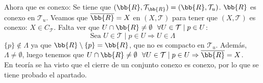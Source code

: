 \documentclass[12pt]{article}
\newcounter{ejercicio}[section] %
\newcounter{ejercicio}
\begin{document}
\begin{ejercicio}[3 puntos]
\begin{enumerate}[label=(\alph*)]
                \noindent
                Ahora que es conexo:\newline
                Se tiene que $(\bb{R}, \mathcal{T}_{\bb{R}}) = (\bb{R}, \mathcal{T}_u)$. $\bb{R}$ es conexo en $\mathcal{T}_u$.\newline
                Veamos que $\overline{\bb{R}} = X$ en $(X, \mathcal{T})$ para tener que $(X, \mathcal{T})$ es conexo:\newline
                $X \in C_{\mathcal{T}}$. Falta ver que $U \cap \bb{R} \neq \emptyset~~\forall U \in \mathcal{T} \mid p\in U$:
                $$\mbox{Sea } U \in \mathcal{T} \mid p \in U \Rightarrow U \in \Lambda$$
                $\{p\} \notin \Lambda$ ya que $\bb{R}\setminus \{p\} = \bb{R}$, que no es compacto en $\mathcal{T}_u$.\newline
                Además, $\Lambda \neq \emptyset$, luego tenemos que $U \cap \bb{R} \neq \emptyset~~\forall U \in \mathcal{T} \mid p \in U \Rightarrow \overline{\bb{R}} = X$.\\

                \noindent
                En teoría se ha visto que el cierre de un conjunto conexo es conexo, por lo que se tiene probado el apartado.

        \end{enumerate}
    \end{ejercicio}
\end{document}
